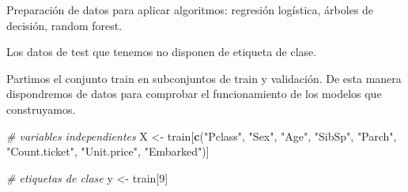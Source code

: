 \documentclass[
]{article}
\newenvironment{Shaded}{\begin{snugshade}}{\end{snugshade}}
\newcommand{\CommentTok}[1]{\textcolor[rgb]{0.56,0.35,0.01}{\textit{#1}}}
\newcommand{\DecValTok}[1]{\textcolor[rgb]{0.00,0.00,0.81}{#1}}
\newcommand{\KeywordTok}[1]{\textcolor[rgb]{0.13,0.29,0.53}{\textbf{#1}}}
\newcommand{\NormalTok}[1]{#1}
\newcommand{\OperatorTok}[1]{\textcolor[rgb]{0.81,0.36,0.00}{\textbf{#1}}}
\newcommand{\StringTok}[1]{\textcolor[rgb]{0.31,0.60,0.02}{#1}}
\begin{document}
\texttt{}

\begin{Shaded}
\end{Shaded}

\texttt{}

\begin{Shaded}
\end{Shaded}

\texttt{}

Preparación de datos para aplicar algoritmos: regresión logística,
árboles de decisión, random forest.

Los datos de test que tenemos no disponen de etiqueta de clase.

Partimos el conjunto train en subconjuntos de train y validación. De
esta manera dispondremos de datos para comprobar el funcionamiento de
los modelos que construyamos.

\texttt{}

\begin{Shaded}
\begin{Highlighting}[]
\CommentTok{# variables independientes}
\NormalTok{X <-}\StringTok{ }\NormalTok{train[}\KeywordTok{c}\NormalTok{(}\StringTok{"Pclass"}\NormalTok{, }\StringTok{"Sex"}\NormalTok{, }\StringTok{"Age"}\NormalTok{, }\StringTok{"SibSp"}\NormalTok{, }\StringTok{"Parch"}\NormalTok{,}
             \StringTok{"Count.ticket"}\NormalTok{, }\StringTok{"Unit.price"}\NormalTok{, }\StringTok{"Embarked"}\NormalTok{)]}

\CommentTok{# etiquetas de clase}
\NormalTok{y <-}\StringTok{ }\NormalTok{train[}\DecValTok{9}\NormalTok{]}
\end{Highlighting}
\end{Shaded}
\end{document}
